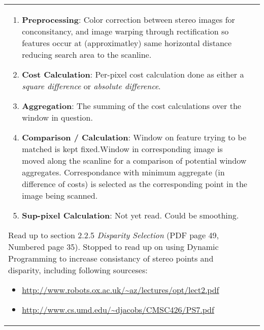 \documentclass[a4paper,10pt]{article}
\begin{document}
\begin{longtable}{l p{12cm} }
{\par\begin{enumerate}
\item \textbf{Preprocessing}: Color correction between stereo images for conconsitancy, and image warping through rectification so features occur at (approximatley) same horizontal distance reducing search area to the scanline.
\item \textbf{Cost Calculation}: Per-pixel cost calculation done as either a \textit{square difference} or \textit{absolute difference}.
\item \textbf{Aggregation}: The summing of the cost calculations over the window in question.
\item \textbf{Comparison / Calculation}: Window on feature trying to be matched is kept fixed.Window in corresponding image  is moved along the scanline for a comparison of potential window aggregates. Correspondance with minimum aggregate (in difference of costs) is selected as the corresponding point in the image being scanned.
\item \textbf{Sup-pixel Calculation}: Not yet read. Could be smoothing.\newline
\end{enumerate}
\par Read up to section 2.2.5 \textit{Disparity Selection} (PDF page 49, Numbered page 35). Stopped to read up on using Dynamic Programming to increase consistancy of stereo points and disparity, including following sourceses:\newline
\par\begin{itemize}
\item \url{http://www.robots.ox.ac.uk/~az/lectures/opt/lect2.pdf}
\item \url{http://www.cs.umd.edu/~djacobs/CMSC426/PS7.pdf}
\end{itemize}

		}
	\end{longtable}

	\newpage


	{}
	
\end{document}
